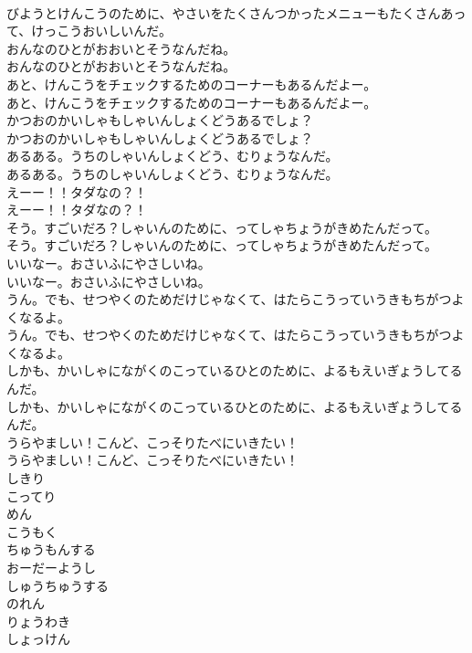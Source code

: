 \documentclass[8pt]{extreport}
\begin{document}
\begin{CJK}{UTF8}{min}
\\	びようとけんこうのために、やさいをたくさんつかったメニューもたくさんあって、けっこうおいしいんだ。 
\\	おんなのひとがおおいとそうなんだね。	
\\	おんなのひとがおおいとそうなんだね。 
\\	あと、けんこうをチェックするためのコーナーもあるんだよー。	
\\	あと、けんこうをチェックするためのコーナーもあるんだよー。 
\\	かつおのかいしゃもしゃいんしょくどうあるでしょ？	
\\	かつおのかいしゃもしゃいんしょくどうあるでしょ？ 
\\	あるある。うちのしゃいんしょくどう、むりょうなんだ。	
\\	あるある。うちのしゃいんしょくどう、むりょうなんだ。 
\\	えーー！！タダなの？！	
\\	えーー！！タダなの？！ 
\\	そう。すごいだろ？しゃいんのために、ってしゃちょうがきめたんだって。	
\\	そう。すごいだろ？しゃいんのために、ってしゃちょうがきめたんだって。 
\\	いいなー。おさいふにやさしいね。	
\\	いいなー。おさいふにやさしいね。 
\\	うん。でも、せつやくのためだけじゃなくて、はたらこうっていうきもちがつよくなるよ。	
\\	うん。でも、せつやくのためだけじゃなくて、はたらこうっていうきもちがつよくなるよ。 
\\	しかも、かいしゃにながくのこっているひとのために、よるもえいぎょうしてるんだ。	
\\	しかも、かいしゃにながくのこっているひとのために、よるもえいぎょうしてるんだ。 
\\	うらやましい！こんど、こっそりたべにいきたい！	
\\	うらやましい！こんど、こっそりたべにいきたい！ 
\\	しきり
\\	こってり
\\	めん
\\	こうもく
\\	ちゅうもんする
\\	おーだーようし
\\	しゅうちゅうする
\\	のれん
\\	りょうわき
\\	しょっけん

\end{CJK}
\end{document}
